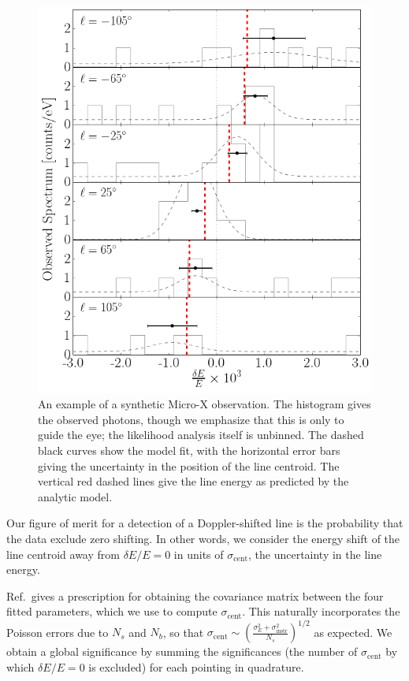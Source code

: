 \documentclass[aps,prd,10pt,twocolumn,superscriptaddress,showpacs]{revtex4-1}
\begin{document}
\begin{figure}[h!]
\centering
\includegraphics[width=1.0\columnwidth]{example_obs.png}
\caption{ An example of a synthetic Micro-X observation. The histogram gives the observed photons,
	though we emphasize that this is only to guide the eye; the likelihood analysis itself is
	unbinned. The dashed black curves show the model fit, with the horizontal error bars giving the
	uncertainty in the position of the line centroid. The vertical red dashed lines give the line
	energy as predicted by the analytic model.
}
\label{fig:synobs}
\end{figure}



Our figure of merit for a detection of a Doppler-shifted line is the probability that the data
exclude zero shifting. In other words, we consider the energy shift of the line centroid
away from $\delta E/E=0$ in units of $\sigma_\mathrm{cent}$, the uncertainty in the line energy.

Ref.\,\cite{barlow1990} gives a prescription for obtaining the covariance matrix between the four fitted
parameters, which we use to compute $\sigma_\mathrm{cent}$. This naturally incorporates the Poisson errors due to
$N_s$ and $N_b$, so that $\sigma_\mathrm{cent} \sim \left(\frac{\sigma_E^2+\sigma_\mathrm{instr}^2
}{N_s}\right)^{1/2}$ as expected. 
We obtain a global significance by summing the significances (the
number of $\sigma_\mathrm{cent}$ by which $\delta E/E=0$ is excluded) for each
pointing in quadrature.
\end{document}
